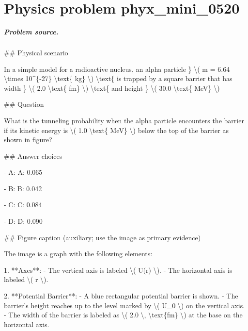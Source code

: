 
\chapter{Physics problem phyx\_mini\_0520}
\label{ch:PhyXMiniProblems_problem_phyx_mini_0520}

\paragraph{Problem source.}
\#\# Physical scenario

In a simple model for a radioactive nucleus, an alpha particle \} \textbackslash{}( m = 6.64 \textbackslash{}times 10\textasciicircum{}\{-27\} \textbackslash{}text\{ kg\} \textbackslash{}) \textbackslash{}text\{ is trapped by a square barrier that has width \} \textbackslash{}( 2.0 \textbackslash{}text\{ fm\} \textbackslash{}) \textbackslash{}text\{ and height \} \textbackslash{}( 30.0 \textbackslash{}text\{ MeV\} \textbackslash{})

\#\# Question

What is the tunneling probability when the alpha particle encounters the barrier if its kinetic energy is \textbackslash{}( 1.0 \textbackslash{}text\{ MeV\} \textbackslash{}) below the top of the barrier as shown in figure?

\#\# Answer choices

- A: A: 0.065

- B: B: 0.042

- C: C: 0.084

- D: D: 0.090

\#\# Figure caption (auxiliary; use the image as primary evidence)

The image is a graph with the following elements:

1. **Axes**: 
   - The vertical axis is labeled \textbackslash{}( U(r) \textbackslash{}).
   - The horizontal axis is labeled \textbackslash{}( r \textbackslash{}).

2. **Potential Barrier**: 
   - A blue rectangular potential barrier is shown.
   - The barrier's height reaches up to the level marked by \textbackslash{}( U\_0 \textbackslash{}) on the vertical axis.
   - The width of the barrier is labeled as \textbackslash{}( 2.0 \textbackslash{}, \textbackslash{}text\{fm\} \textbackslash{}) at the base on the horizontal axis.

